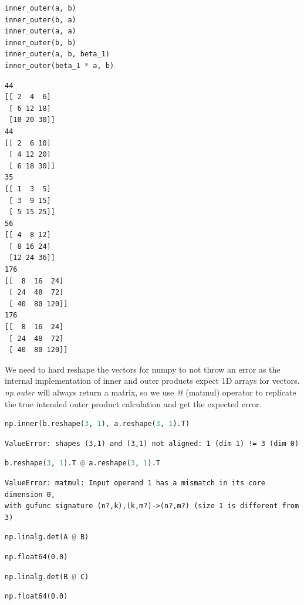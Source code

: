 \documentclass[11pt,letterpaper]{article}
\begin{document}
\begin{enumerate}
\begin{enumerate}
\begin{lstlisting}[language=python]
inner_outer(a, b)
inner_outer(b, a)
inner_outer(a, a)
inner_outer(b, b)
inner_outer(a, b, beta_1)
inner_outer(beta_1 * a, b)
\end{lstlisting}
\begin{verbatim}
44
[[ 2  4  6]
 [ 6 12 18]
 [10 20 30]]
44
[[ 2  6 10]
 [ 4 12 20]
 [ 6 18 30]]
35
[[ 1  3  5]
 [ 3  9 15]
 [ 5 15 25]]
56
[[ 4  8 12]
 [ 8 16 24]
 [12 24 36]]
176
[[  8  16  24]
 [ 24  48  72]
 [ 40  80 120]]
176
[[  8  16  24]
 [ 24  48  72]
 [ 40  80 120]]
\end{verbatim}
We need to hard reshape the vectors for numpy to not throw an error as the internal
implementation of inner and outer products expect 1D arrays for vectors. 
\textit{np.outer} will always return a matrix, so we use \textit{@} (matmul) operator
to replicate the true intended outer product calculation and get the expected error.
\begin{lstlisting}[language=python]
np.inner(b.reshape(3, 1), a.reshape(3, 1).T)
\end{lstlisting}
\begin{verbatim}
ValueError: shapes (3,1) and (3,1) not aligned: 1 (dim 1) != 3 (dim 0)
\end{verbatim}
\begin{lstlisting}[language=python]
b.reshape(3, 1).T @ a.reshape(3, 1).T
\end{lstlisting}
\begin{verbatim}
ValueError: matmul: Input operand 1 has a mismatch in its core dimension 0, 
with gufunc signature (n?,k),(k,m?)->(n?,m?) (size 1 is different from 3)
\end{verbatim}
\begin{lstlisting}[language=python]
np.linalg.det(A @ B)
\end{lstlisting}
\begin{verbatim}
np.float64(0.0)
\end{verbatim}
\begin{lstlisting}[language=python]
np.linalg.det(B @ C)
\end{lstlisting}
\begin{verbatim}
np.float64(0.0)
\end{verbatim}
\end{enumerate}
\end{enumerate}
\end{document}
